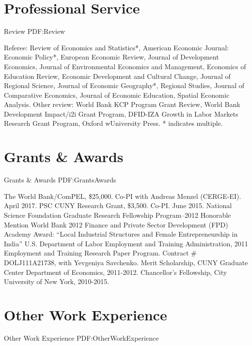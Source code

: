 \documentclass[letterpaper,10pt,oneside]{article}
\begin{document}
\begin{body}
\section
{Professional Service}
{Review}
{PDF:Review}
\par Referee: Review of Economics and Statistics*, American Economic Journal: Economic Policy*, European Economic Review, Journal of Development Economics, Journal of Environmental Economics and Management, Economics of Education Review, Economic Development and Cultural Change, Journal of Regional Science, Journal of Economic Geography*, Regional Studies, Journal of Comparative Economics, Journal of Economic Education, Spatial Economic Analysis. Other review: World Bank KCP Program Grant Review, World Bank Development Impact/i2i Grant Program, DFID-IZA Growth in Labor Markets Research Grant Program, Oxford wUniversity Press. * indicates multiple.

\section
{Grants\newline
\& Awards}
{Grants \& Awards}
{PDF:GrantsAwards}
\par
\BulletItem
The World Bank/ComPEL, \$25,000. Co-PI with Andreas Menzel (CERGE-EI). April 2017.
\BulletItem
PSC CUNY Research Grant, \$3,500. Co-PI. June 2015.
\BulletItem
National Science Foundation Graduate Research Fellowship Program--2012 Honorable Mention
\BulletItem
World Bank 2012 Finance and Private Sector Development (FPD) Academy Award: ``Local Industrial Structures and Female Entrepreneurship in India''
\BulletItem
U.S. Department of Labor Employment and Training Administration, 2011 Employment and Training Research Paper Program. Contract \# DOLJ111A21738, with Yevgeniya Savchenko.
\BulletItem
Merit Scholarship, CUNY Graduate Center Department of Economics, 2011-2012.
\BulletItem
Chancellor's Fellowship, City University of New York, 2010-2015.


\section
{Other Work\newline
Experience}
{Other Work Experience}
{PDF:OtherWorkExperience}



\end{body}
\end{document}
